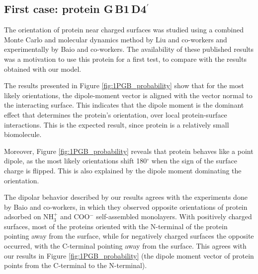 
\subsection{First case: protein G\,B1\,D4$^\prime$} \label{sec:disc_1PGB}

The orientation of protein \gb near charged surfaces was studied using a combined Monte Carlo and molecular dynamics method by Liu and co-workers\cite{LiuLiaoZhou2013} and experimentally by Baio and co-workers.\cite{BaioWeidnerBaughGambleStaytonCastner2012} The availability of these published results was a motivation to use this protein for a first test, to compare with the results obtained with our model. 

The results presented in Figure \ref{fig:1PGB_probability} show that for the most likely orientations, the dipole-moment vector is aligned with the vector normal to the interacting surface. This indicates that the dipole moment is the dominant effect that determines the protein's orientation, over local protein-surface  interactions. This is the expected result, since protein \gb is a relatively small biomolecule. 

Moreover, Figure \ref{fig:1PGB_probability} reveals that protein \gb behaves like a point dipole, as the most likely orientations shift 180$^\circ$ when the sign of the surface charge is flipped. This is also explained by the dipole moment dominating the orientation.

The dipolar behavior described by our results agrees with the experiments done by Baio and co-workers, \cite{BaioWeidnerBaughGambleStaytonCastner2012} in which they observed opposite orientations of protein \gb adsorbed on NH$_3^+$ and COO$^-$ self-assembled monolayers. With positively charged surfaces, most of the proteins oriented with the N-terminal of the protein pointing away from the surface, while for negatively charged surfaces the opposite occurred, with the C-terminal pointing away from the surface. This agrees with our results in Figure \ref{fig:1PGB_probability} (the dipole moment vector of protein \gb points from the C-terminal to the N-terminal).

